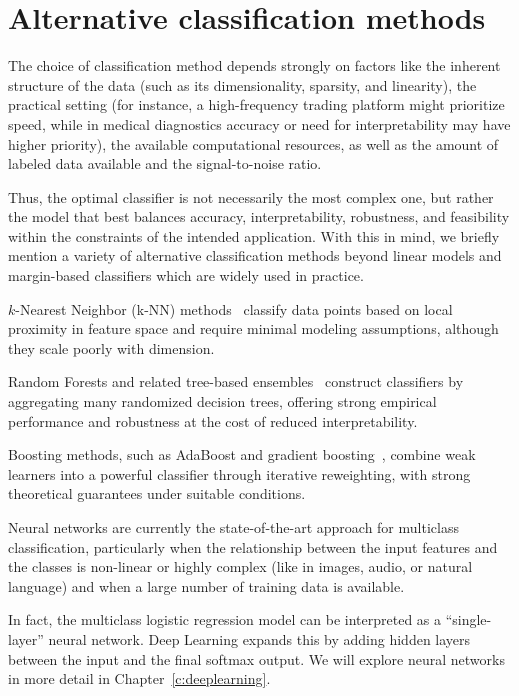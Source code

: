 \section{Alternative classification methods}

The choice of classification method depends strongly on factors like the inherent structure of the data (such as its dimensionality, sparsity, and linearity), the practical setting (for instance, a high-frequency trading platform might prioritize speed, while in medical diagnostics accuracy or need for interpretability may have higher priority), the available computational resources, as well as the amount of labeled data available and the signal-to-noise ratio.

Thus, the  optimal classifier is not necessarily the most complex one, but rather the model that best balances accuracy, interpretability, robustness, and feasibility within the constraints of the intended application. With this in mind, we briefly mention a variety of alternative classification methods beyond linear models and margin-based classifiers which are widely used in practice.


$k$-Nearest Neighbor (k-NN) methods~\cite{cover1967nearest} classify data points based on local proximity in feature space and require minimal modeling assumptions, although they scale poorly with dimension. 

Random Forests and related tree-based ensembles~\cite{ho1998random,breiman2001random} construct classifiers by aggregating many randomized decision trees, offering strong empirical performance and robustness at the cost of reduced interpretability. 

Boosting methods, such as AdaBoost and gradient boosting~\cite{freund1997decision,friedman2001greedy,chen2016xgboost}, combine weak learners into a powerful classifier through iterative reweighting, with strong theoretical guarantees under suitable conditions. 


Neural networks are currently the state-of-the-art approach for multiclass classification, particularly when the relationship between the input features and the classes is non-linear or highly complex (like in images, audio, or natural language) and when a large number of training data is available. 

In fact, the multiclass logistic regression model can be interpreted as a ``single-layer'' neural network. Deep Learning expands this by adding hidden layers between the input and the final softmax output. We will explore neural networks in more detail in Chapter~\ref{c:deeplearning}.








